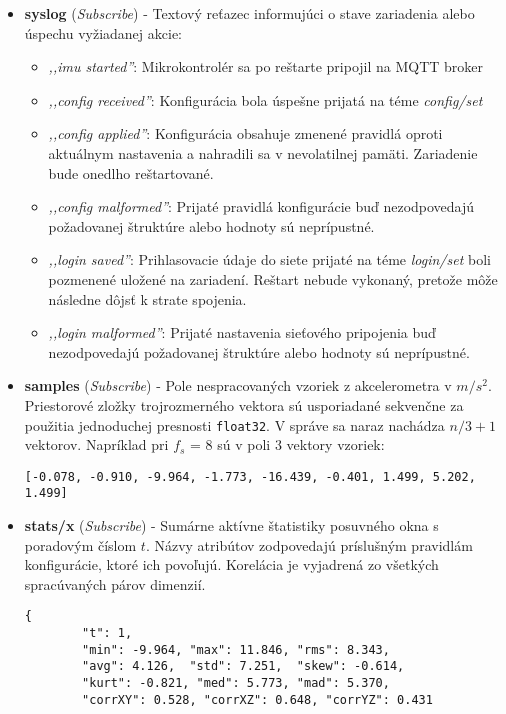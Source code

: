 \begin{itemize}[noitemsep,topsep=0pt]
	\item \textbf{syslog} (\emph{Subscribe}) - Textový reťazec informujúci o stave zariadenia alebo úspechu vyžiadanej akcie:
		\begin{itemize}[noitemsep,topsep=0pt,label=$\star$]
			\item \emph{,,imu started''}: Mikrokontrolér sa po reštarte pripojil na MQTT broker
			\item \emph{,,config received''}: Konfigurácia bola úspešne prijatá na téme \emph{config/set}
			\item \emph{,,config applied''}: Konfigurácia obsahuje zmenené pravidlá oproti aktuálnym nastavenia a nahradili sa v 
			nevolatilnej pamäti. Zariadenie bude onedlho reštartované.
			\item \emph{,,config malformed''}: Prijaté pravidlá konfigurácie buď nezodpovedajú požadovanej štruktúre alebo
			hodnoty sú neprípustné. 
			\item \emph{,,login saved''}: Prihlasovacie údaje do siete prijaté na téme \emph{login/set} boli pozmenené uložené na zariadení. 
			Reštart nebude vykonaný, pretože môže následne dôjsť k strate spojenia.
			\item \emph{,,login malformed''}: Prijaté nastavenia sieťového pripojenia buď nezodpovedajú požadovanej štruktúre alebo
			hodnoty sú neprípustné. 
		\end{itemize}
	\item \textbf{samples} (\emph{Subscribe}) - Pole nespracovaných vzoriek z akcelerometra v $m/s^2$. Priestorové zložky 
	trojrozmerného vektora sú usporiadané sekvenčne za použitia jednoduchej presnosti \verb|float32|. V správe sa naraz nachádza
	$n / 3 + 1$ vektorov. Napríklad pri $f_s$ = 8 sú v poli 3 vektory vzoriek:
	\begin{lstlisting}[style=messages]
	[-0.078, -0.910, -9.964, -1.773, -16.439, -0.401, 1.499, 5.202, 1.499]
	\end{lstlisting}
	\item \textbf{stats/x} (\emph{Subscribe}) - Sumárne aktívne štatistiky posuvného okna s poradovým číslom $t$. Názvy atribútov
	zodpovedajú príslušným pravidlám konfigurácie, ktoré ich povoľujú. Korelácia je vyjadrená zo všetkých spracúvaných párov dimenzií.
	\begin{lstlisting}[style=messages]
	{
		"t": 1, 
		"min": -9.964, "max": 11.846, "rms": 8.343, 
		"avg": 4.126,  "std": 7.251,  "skew": -0.614, 
		"kurt": -0.821, "med": 5.773, "mad": 5.370,
		"corrXY": 0.528, "corrXZ": 0.648, "corrYZ": 0.431

\end{lstlisting}
\end{itemize}
